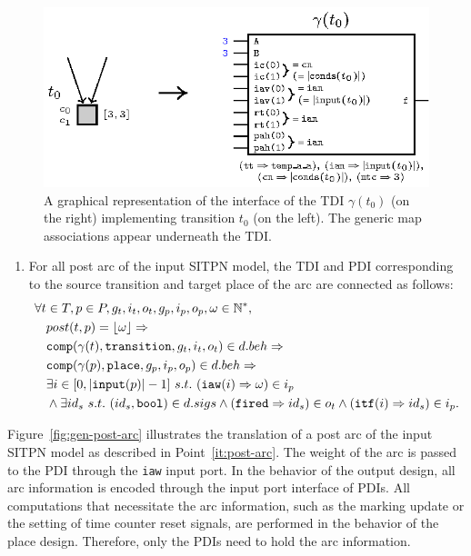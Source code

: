 \begin{definition}
  \begin{figure}[h]
    \centering
    \includegraphics[keepaspectratio,width=.8\textwidth]{gen-tdi-ex.eps}
    \caption{A graphical representation of the interface of the TDI
      $\gamma(t_0)$ (on the right) implementing transition $t_0$ (on
      the left). The generic map associations appear underneath the
      TDI.}
    \label{fig:gen-tdi-ex}
  \end{figure}
  
  \begin{enumerate}[resume]        
  \item\label{it:post-arc} For all post arc of the input SITPN model,
    the TDI and PDI corresponding to the source transition and target
    place of the arc are connected as follows:
    \begin{equation*}
      \begin{aligned}[t]
        \forall{}t&\in{}T,p\in{}P,g_t,i_t,o_t,g_p,i_p,o_p,\omega\in\mathbb{N}^{*}, \\
                  & post(t,p)=\lfloor\omega\rfloor\Rightarrow \\
                  & \mathtt{comp}(\gamma(t),\mathtt{transition},g_t,i_t,o_t)\in{}d.beh\Rightarrow \\
                  & \mathtt{comp}(\gamma(p),\mathtt{place},g_p,i_p,o_p)\in{}d.beh\Rightarrow\\
                  & \exists{}i\in[0,\vert\mathtt{input}(p)\vert-1]~s.t.~(\mathtt{iaw}(i)\Rightarrow\omega)\in{}i_p \\
                  & \land\exists{}id_s~s.t.~(id_s,\mathtt{bool})\in{}d.sigs
                    \land(\mathtt{fired}\Rightarrow{}id_s)\in{}o_t\land(\mathtt{itf}(i)\Rightarrow{}id_s)\in{}i_p. \\
      \end{aligned}
    \end{equation*}

  \end{enumerate}
  
  \bigskip

  Figure~\ref{fig:gen-post-arc} illustrates the translation of a post
  arc of the input SITPN model as described in
  Point~\ref{it:post-arc}. The weight of the arc is passed to the PDI
  through the \texttt{iaw} input port. In the behavior of the output
  design, all arc information is encoded through the input port
  interface of PDIs. All computations that necessitate the arc
  information, such as the marking update or the setting of time
  counter reset signals, are performed in the behavior of the place
  design. Therefore, only the PDIs need to hold the arc information.


\end{definition}
